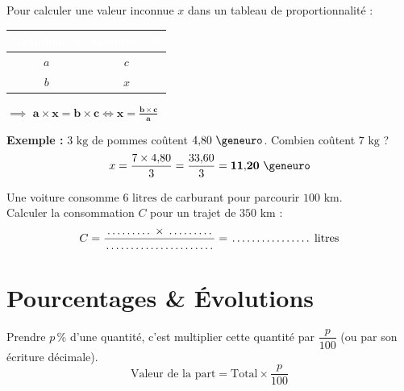 \begin{cadremethode}
Pour calculer une valeur inconnue $x$ dans un tableau de proportionnalité :
\begin{center}
\renewcommand{\arraystretch}{1.3}
\begin{tabular}{|c|c|}
\hline
\rowcolor{slate800} \textcolor{white}{\textbf{Grandeur A}} & \textcolor{white}{\textbf{Grandeur B}} \\
\hline
$a$ & $c$ \\
\hline
$b$ & $x$ \\
\hline
\end{tabular}
\qquad $\implies$ \qquad $\mathbf{a \times x = b \times c} \iff \mathbf{x = \frac{b \times c}{a}}$
\end{center}

\textbf{Exemple :} $3\text{ kg}$ de pommes coûtent $4{,}80\text{ \euro{}}$. Combien coûtent $7\text{ kg}$ ?
\[ x = \frac{7 \times 4{,}80}{3} = \frac{33{,}60}{3} = \mathbf{11{,}20\text{ \euro{}}} \]
\end{cadremethode}

\begin{cadreexemple}
Une voiture consomme $6\text{ litres}$ de carburant pour parcourir $100\text{ km}$.\\
Calculer la consommation $C$ pour un trajet de $350\text{ km}$ :
\[ C = \frac{\pointille[1.5cm] \times \pointille[1.5cm]}{\pointille[1.5cm]} = \pointille[2.5cm]\text{ litres} \]
\end{cadreexemple}

\section{Pourcentages \& Évolutions}

\begin{cadreprop}
Prendre $p\,\%$ d'une quantité, c'est multiplier cette quantité par $\dfrac{p}{100}$ (ou par son écriture décimale).
\[ \text{Valeur de la part} = \text{Total} \times \frac{p}{100} \]
\end{cadreprop}

